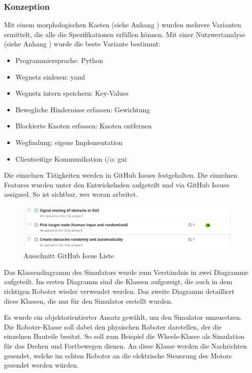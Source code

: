 \subsubsection{Konzeption}

Mit einem morphologischen Kasten (siehe Anhang ) wurden mehrere Varianten ermittelt, die alle die Spezifikationen erfüllen können. Mit einer Nutzwertanalyse (siehe Anhang ) wurde die beste Variante bestimmt:

\begin{itemize}
    \item Programmiersprache: Python
    \item Wegnetz einlesen: \gls{yaml}
    \item Wegnetz intern speichern: Key-Values
    \item Bewegliche Hindernisse erfassen: Gewichtung
    \item Blockierte Knoten erfassen: Knoten entfernen
    \item Wegfindung: eigene Implementation
    \item Clientseitige Kommunikation \acrshort{i/o}: \acrshort{gui}
\end{itemize}

Die einzelnen Tätigkeiten werden in GitHub Issues festgehalten. Die einzelnen Features wurden unter den Entwickelnden aufgeteilt und via GitHub Issues assigned. So ist sichtbar, wer woran arbeitet.

\begin{figure}[H]
\centering
\includegraphics[width=\textwidth]{img/github-issues.png}
\caption{Ausschnitt GitHub Issue Liste}
\label{fig:github-issues}
\end{figure}

Das Klassendiagramm des Simulators wurde zum Verständnis in zwei Diagramme aufgeteilt. Im ersten Diagramm sind die Klassen aufgezeigt, die auch in dem richtigen Roboter wieder verwendet werden. Das zweite Diagramm detailliert diese Klassen, die nur für den Simulator erstellt wurden.

Es wurde ein objektorientierter Ansatz gewählt, um den Simulator umzusetzen. Die Roboter-Klasse soll dabei den physischen Roboter darstellen, der die einzelnen Bauteile besitzt. So soll zum Beispiel die Wheels-Klasse als Simulation für das Drehen und Fortbewegen dienen. An diese Klasse werden die Nachrichten gesendet, welche im echten Roboter an die elektrische Steuerung des Motors gesendet werden würden.

